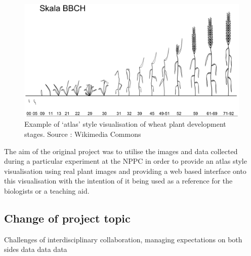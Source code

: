 \begin{figure}[H]
    \centering
    \includegraphics[width=\textwidth]{images/background/bbchscale}
    \caption{Example of `atlas' style visualisation of wheat plant development stages. Source : Wikimedia Commons \cite{bbch_scale}}
    \label{fig:bbch}
\end{figure}

 The aim of the original project was to utilise the images and data collected during a particular experiment at the NPPC in order to provide an atlas style visualisation using real plant images and providing a web based interface onto this visualisation with the intention of it being used as a reference for the biologists or a teaching aid.



\subsection{Change of project topic}
Challenges of interdisciplinary collaboration, managing expectations on both sides data data data

